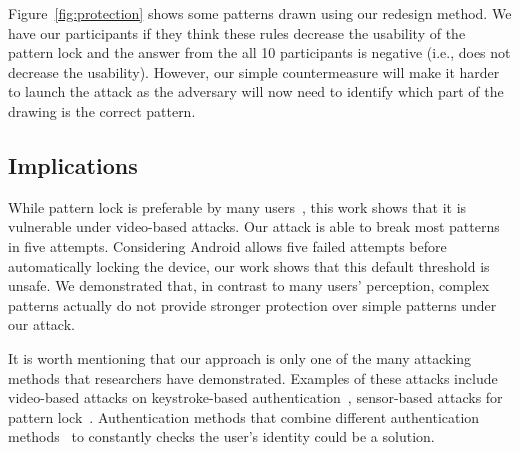 Figure~\ref{fig:protection} shows some patterns drawn using our redesign method. We have our participants if they think these rules decrease
the usability  of the pattern lock and the answer from the all 10 participants is negative (i.e., does not decrease the usability). 
However, our simple countermeasure will make it harder to launch the attack as the adversary will now need to 
identify which part of the drawing is the correct pattern. 



\subsection{Implications}
While pattern lock is preferable by many users~\cite{androidstudy}, this     work shows
that it is vulnerable under video-based attacks. Our attack
is able to break most patterns in five attempts. Considering Android
allows five failed attempts before automatically locking the device, our work
shows that this default threshold is unsafe. We demonstrated that, in contrast to many users'
perception, complex patterns actually do not provide stronger protection over simple patterns under our attack.

It is worth mentioning that our approach is only one of the many attacking
methods that researchers have demonstrated. Examples of these attacks include
video-based attacks on keystroke-based authentication~\cite{shukla2014beware,yue2014blind}, sensor-based attacks for
pattern lock~\cite{zhang2016privacy}. Authentication methods that combine different
authentication methods~\cite{de2012touch,stefan2012robustness,lingsecure,mannan2007using} to constantly checks the user's identity could be
a solution. %



